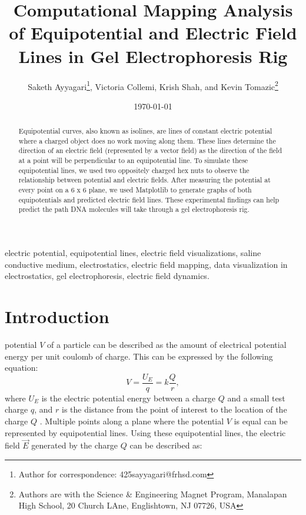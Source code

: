 \documentclass[10pt,journal,twoside]{IEEEtran}
\title{Computational Mapping Analysis of Equipotential and Electric Field Lines in Gel Electrophoresis Rig}
\author{Saketh Ayyagari\thanks{Author for correspondence: 425sayyagari@frhsd.com}, Victoria Collemi, Krish Shah, and Kevin Tomazic\thanks{Authors are with the Science \& Engineering Magnet Program, Manalapan High School, 20 Church LAne, Englishtown, NJ 07726, USA}}
\date{\today}
\begin{document}
\maketitle

\begin{abstract}
Equipotential curves, also known as isolines, are lines of constant electric potential where a charged object does no work moving along them. These lines determine the direction of an electric field (represented by a vector field) as the direction of the field at a point will be perpendicular to an equipotential line. To simulate these equipotential lines, we used two oppositely charged hex nuts to observe the relationship between potential and electric fields. After measuring the potential at every point on a 6 x 6 plane, we used Matplotlib to generate graphs of both equipotentials and predicted electric field lines. These experimental findings can help predict the path DNA molecules will take through a gel electrophoresis rig.
\end{abstract}

\begin{IEEEkeywords}
electric potential, equipotential lines, electric field visualizations, saline conductive medium, electrostatics, electric field mapping, data visualization in electrostatics, gel electrophoresis, electric field dynamics.
\end{IEEEkeywords}

\section{Introduction}
 potential $V$ of a particle can be described as the amount of electrical potential energy per unit coulomb of charge. This can be expressed by the following equation:
\begin{equation}
V = \frac{U_E}{q} = k \frac{Q}{r},
\label{eq:1}
\end{equation}
where $U_E$ is the electric potential energy between a charge $Q$ and a small test charge $q$, and $r$ is the distance from the point of interest to the location of the charge $Q$ \cite{tipler}. Multiple points along a plane where the potential $V$ is equal can be represented by equipotential lines. Using these equipotential lines, the electric field $\vec{E}$ generated by the charge $Q$ can be described as:
\end{document}
